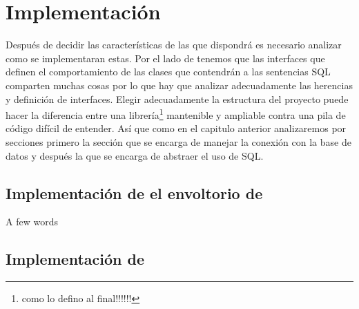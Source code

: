 \chapter{Implementación}
Después de decidir las características de las que dispondrá \jj es necesario analizar como se implementaran estas. Por el lado de \cc tenemos que las interfaces que definen el comportamiento de las clases que contendrán a las sentencias SQL comparten muchas cosas por lo que hay que analizar adecuadamente las herencias y definición de interfaces. Elegir adecuadamente la estructura del proyecto puede hacer la diferencia entre una librería\footnote{como lo defino al final!!!!!!} mantenible y ampliable contra una pila de código difícil de entender. Así que como en el capitulo anterior analizaremos \jj por secciones  primero la sección que se encarga de manejar la conexión con la base de datos y después la que se encarga de abstraer el uso de SQL.






\section{Implementación de el envoltorio de \jj}

A few words




\section{Implementación de \cc}

